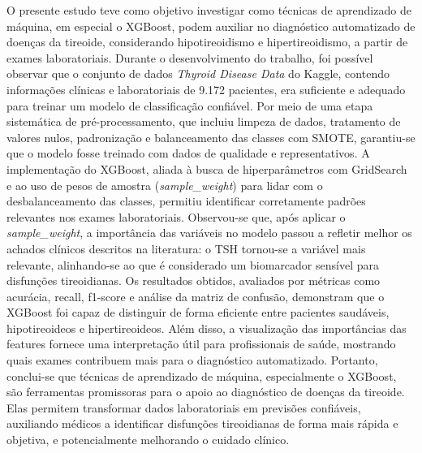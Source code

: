 \documentclass[11pt]{article}
\begin{document}
O presente estudo teve como objetivo investigar como técnicas de aprendizado de máquina, em especial o XGBoost, podem auxiliar no diagnóstico automatizado de doenças da tireoide, considerando hipotireoidismo e hipertireoidismo, a partir de exames laboratoriais.
Durante o desenvolvimento do trabalho, foi possível observar que o conjunto de dados \textit{Thyroid Disease Data} do Kaggle, contendo informações clínicas e laboratoriais de 9.172 pacientes, era suficiente e adequado para treinar um modelo de classificação confiável. Por meio de uma etapa sistemática de pré-processamento, que incluiu limpeza de dados, tratamento de valores nulos, padronização e balanceamento das classes com SMOTE, garantiu-se que o modelo fosse treinado com dados de qualidade e representativos.
A implementação do XGBoost, aliada à busca de hiperparâmetros com GridSearch e ao uso de pesos de amostra (\textit{sample\_weight}) para lidar com o desbalanceamento das classes, permitiu identificar corretamente padrões relevantes nos exames laboratoriais. Observou-se que, após aplicar o \textit{sample\_weight}, a importância das variáveis no modelo passou a refletir melhor os achados clínicos descritos na literatura: o TSH tornou-se a variável mais relevante, alinhando-se ao que é considerado um biomarcador sensível para disfunções tireoidianas.
Os resultados obtidos, avaliados por métricas como acurácia, recall, f1-score e análise da matriz de confusão, demonstram que o XGBoost foi capaz de distinguir de forma eficiente entre pacientes saudáveis, hipotireoideos e hipertireoideos. Além disso, a visualização das importâncias das features fornece uma interpretação útil para profissionais de saúde, mostrando quais exames contribuem mais para o diagnóstico automatizado.
Portanto, conclui-se que técnicas de aprendizado de máquina, especialmente o XGBoost, são ferramentas promissoras para o apoio ao diagnóstico de doenças da tireoide. Elas permitem transformar dados laboratoriais em previsões confiáveis, auxiliando médicos a identificar disfunções tireoidianas de forma mais rápida e objetiva, e potencialmente melhorando o cuidado clínico.

\newpage
\printbibliography
\end{document}
